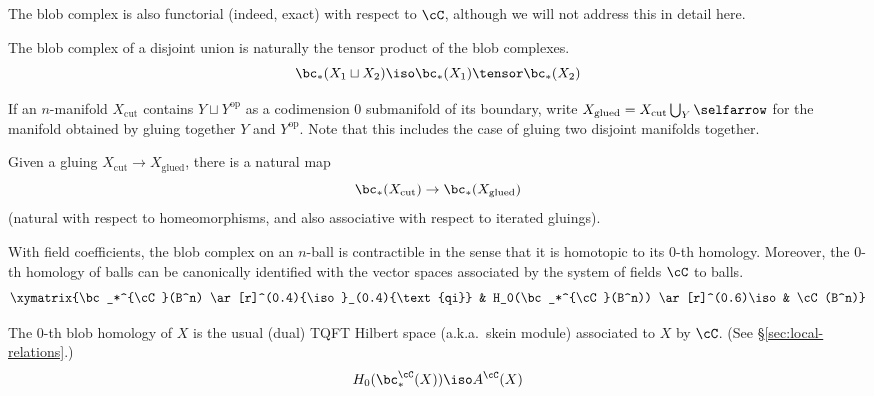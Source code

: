 The blob complex is also functorial (indeed, exact) with respect to $\cC$, although we will not address this in detail here.

\begin{property}
\label{property:disjoint-union}
The blob complex of a disjoint union is naturally the tensor product of the blob complexes.
\begin{equation*}
\bc_*(X_1 \du X_2) \iso \bc_*(X_1) \tensor \bc_*(X_2)
\end{equation*}
\end{property}

If an $n$-manifold $X_\text{cut}$ contains $Y \sqcup Y^\text{op}$ as a codimension $0$ submanifold of its boundary, write $X_\text{glued} = X_\text{cut} \bigcup_{Y}\selfarrow$ for the manifold obtained by gluing together $Y$ and $Y^\text{op}$. Note that this includes the case of gluing two disjoint manifolds together.
\begin{property}
\label{property:gluing-map}%
Given a gluing $X_\mathrm{cut} \to X_\mathrm{glued}$, there is
a natural map
\[
	\bc_*(X_\mathrm{cut}) \to \bc_*(X_\mathrm{glued}) 
\]
(natural with respect to homeomorphisms, and also associative with respect to iterated gluings).
\end{property}

\begin{property}[Contractibility]
\label{property:contractibility}%
With field coefficients, the blob complex on an $n$-ball is contractible in the sense that it is homotopic to its $0$-th homology. Moreover, the $0$-th homology of balls can be canonically identified with the vector spaces associated by the system of fields $\cC$ to balls.
\begin{equation}
\xymatrix{\bc_*^{\cC}(B^n) \ar[r]^(0.4){\iso}_(0.4){\text{qi}} & H_0(\bc_*^{\cC}(B^n)) \ar[r]^(0.6)\iso & \cC(B^n)}
\end{equation}
\end{property}

\begin{property}
\label{property:skein-modules}%
The $0$-th blob homology of $X$ is the usual 
(dual) TQFT Hilbert space (a.k.a.\ skein module) associated to $X$
by $\cC$. (See \S \ref{sec:local-relations}.)
\begin{equation*}
H_0(\bc_*^{\cC}(X)) \iso A^{\cC}(X)
\end{equation*}
\end{property}

